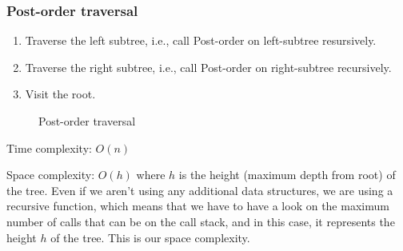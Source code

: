 \documentclass[a4paper,11pt]{book}
\begin{document}
\subsubsection{Post-order traversal}
        \begin{enumerate}
            \item Traverse the left subtree, i.e., call Post-order on left-subtree resursively.
            \item Traverse the right subtree, i.e., call Post-order on right-subtree recursively.
            \item Visit the root.
        \end{enumerate}
        \begin{figure}[ht]
        \begin{center}
        \vspace{6mm}

        \end{center}
        \caption{Post-order traversal}
        \end{figure}
\noindent Time complexity: $O(n)$

\noindent Space complexity: $O(h)$ where $h$ is the height (maximum depth from root) of the tree. Even if we aren't using any additional data structures, we are using a recursive function, which means that we have to have a look on the maximum number of calls that can be on the call stack, and in this case, it represents the height $h$ of the tree. This is our space complexity.
\end{document}
